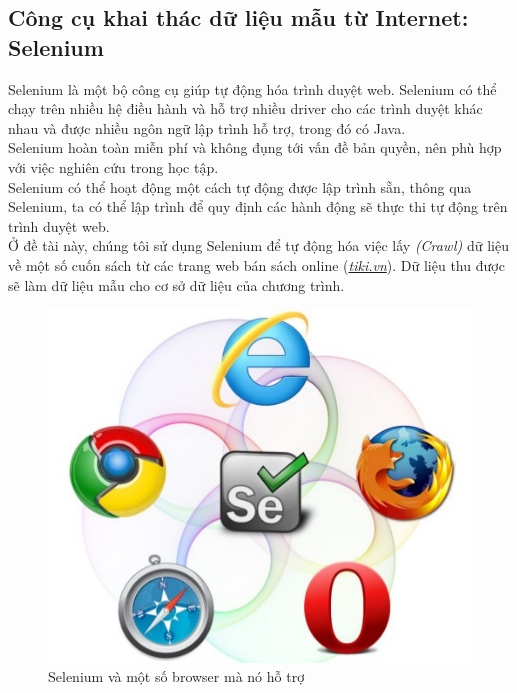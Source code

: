 \documentclass[12pt]{report}
\begin{document}
				\subsection{Công cụ khai thác dữ liệu mẫu từ Internet: Selenium}
					\par Selenium là một bộ công cụ giúp tự động hóa trình duyệt web. Selenium có thể chạy trên nhiều hệ điều hành và hỗ trợ nhiều driver cho các trình duyệt khác nhau và được nhiều ngôn ngữ lập trình hỗ trợ, trong đó có Java. \\
					Selenium hoàn toàn miễn phí và không đụng tới vấn đề bản quyền, nên phù hợp với việc nghiên cứu trong học tập.	\\
					Selenium có thể hoạt động một cách tự động được lập trình sẵn, thông qua Selenium, ta có thể lập trình để quy định các hành động sẽ thực thi tự động trên trình duyệt web. \\		
					Ở đề tài này, chúng tôi sử dụng Selenium để tự động hóa việc lấy \textit{(Crawl)} dữ liệu về một số cuốn sách từ các trang web bán sách online (\href{https://tiki.vn}{\textit{tiki.vn}}). Dữ liệu thu được sẽ làm dữ liệu mẫu cho cơ sở dữ liệu của chương trình.
	 						\begin{figure}[H]
								\centering
								\includegraphics[scale=0.6]{images/selenium.jpg}
								\caption[Selenium và một số browser mà nó hỗ trợ]{Selenium và một số browser mà nó hỗ trợ \protect\footnotemark{}}
								\label{fig:Selenium}
							\end{figure}
\end{document}
